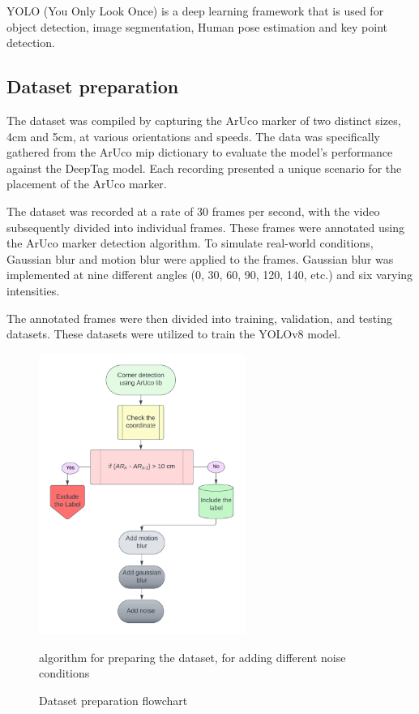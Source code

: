 \documentclass[12pt, twoside]{report}
\begin{document}
YOLO (You Only Look Once) is a deep learning framework that is used for object detection, image segmentation, Human pose estimation and key point detection.


\subsection{Dataset preparation}

The dataset was compiled by capturing the ArUco marker of two distinct sizes,
4cm and 5cm, at various orientations and speeds. The data was specifically
gathered from the ArUco mip dictionary to evaluate the model’s performance
against the DeepTag model. Each recording presented a unique scenario for
the placement of the ArUco marker.

The dataset was recorded at a rate of 30 frames per second, with the video
subsequently divided into individual frames. These frames were annotated
using the ArUco marker detection algorithm. To simulate real-world
conditions, Gaussian blur and motion blur were applied to the frames.
Gaussian blur was implemented at nine different angles (0, 30, 60, 90, 120,
140, etc.) and six varying intensities.

The annotated frames were then divided into training, validation,
and testing datasets. These datasets were utilized to train the YOLOv8 model.

\begin{figure}
    \centering
    \includegraphics[width=0.6\textwidth]{m_dataset_prep.png}
    \caption{Dataset preparation flowchart}
    {algorithm for preparing the dataset, for adding different noise conditions}
    \label{fig:dataset}
\end{figure}
\end{document}
